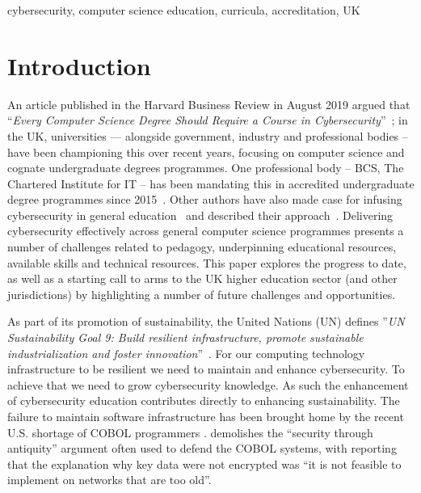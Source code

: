 \documentclass[conference]{IEEEtran}
\begin{document}
\begin{IEEEkeywords}
cybersecurity, computer science education, curricula, accreditation, UK
\end{IEEEkeywords}

\section{Introduction}\label{sec:intro}
An article published in the Harvard Business Review in August 2019 argued that ``{\emph{Every Computer Science Degree Should Require a Course in Cybersecurity}}''~\cite{cable_2019}; in the UK, universities
--- alongside government, industry and professional bodies -- have been championing this over recent years, focusing on computer science and cognate undergraduate degrees programmes. One professional body -- BCS, The Chartered Institute for IT -- has been mandating this in accredited undergraduate degree programmes since 2015~\cite{Cricketal2019}. Other authors have also made case for infusing cybersecurity in general education~\cite{Sobiesk2015} and described their approach~\cite{Blair2020}.  Delivering cybersecurity effectively across general computer science programmes presents a number of challenges related to pedagogy, underpinning educational resources, available skills and technical resources. This paper explores the progress to date, as well as a starting call to arms to the UK higher education sector (and other jurisdictions) by highlighting a number of future challenges and opportunities.

As part of its promotion of sustainability, the United Nations (UN) defines ''{\em{UN Sustainability Goal 9: Build resilient infrastructure, promote sustainable industrialization and foster innovation}}''~\cite{UNgoal9}. For our computing technology infrastructure to be resilient we need to maintain and enhance cybersecurity. To achieve that we need to grow cybersecurity knowledge. As such the enhancement of cybersecurity education contributes directly to enhancing sustainability. The failure to maintain software infrastructure has been brought home by the recent U.S. shortage of COBOL programmers \cite{Shein2020e}.  \cite{PangTanriverdi2017a} demolishes the ``security through antiquity'' argument often used to defend the COBOL systems, with \cite{Sternstein2015a} reporting that the explanation why key data were not encrypted was ``it is not feasible to implement on networks that are too old''.

\end{document}
